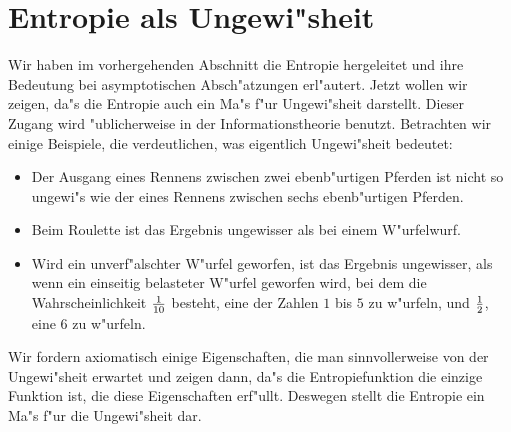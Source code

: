 \documentclass[10pt]{article}
\begin{document}
\section{Entropie als Ungewi"sheit}
Wir haben im vorhergehenden Abschnitt die Entropie hergeleitet und ihre
Bedeutung bei asymptotischen Absch"atzungen erl"autert. Jetzt wollen wir
zeigen, da"s die Entropie auch ein Ma"s f"ur Ungewi"sheit darstellt. Dieser
Zugang wird "ublicherweise in der Informationstheorie benutzt. Betrachten wir
einige Beispiele, die verdeutlichen, was eigentlich Ungewi"sheit bedeutet:
\begin{itemize}
  \item Der Ausgang eines Rennens zwischen zwei ebenb"urtigen Pferden ist
    nicht so ungewi"s wie der eines Rennens zwischen sechs ebenb"urtigen
    Pferden.
  \item Beim Roulette ist das Ergebnis ungewisser als bei einem W"urfelwurf.
  \item Wird ein unverf"alschter W"urfel geworfen, ist das Ergebnis 
    ungewisser, als wenn ein einseitig belasteter W"urfel geworfen wird,
    bei dem die Wahrscheinlichkeit ${1\over 10}$ besteht, eine der Zahlen
    $1$ bis $5$ zu w"urfeln, und ${1\over 2}$, eine $6$ zu w"urfeln.
\end{itemize}
Wir fordern axiomatisch einige Eigenschaften, die man sinnvollerweise von
der Ungewi"sheit erwartet und zeigen dann, da"s die Entropiefunktion die einzige
Funktion ist, die diese Eigenschaften erf"ullt. Deswegen stellt die 
Entropie ein Ma"s f"ur die Ungewi"sheit dar.
\end{document}
